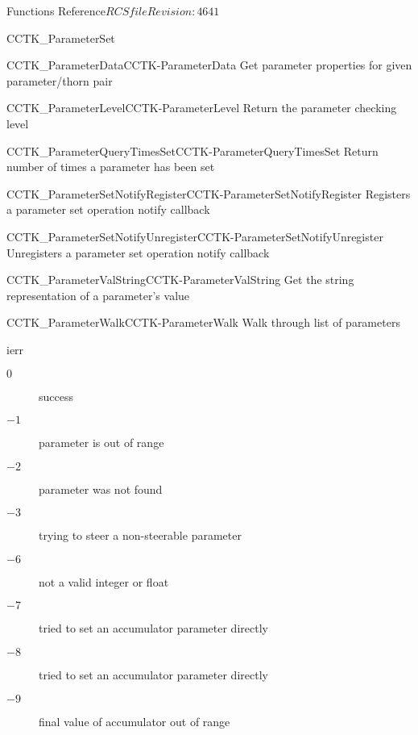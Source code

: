 \begin{cactuspart}{ Functions Reference}{$RCSfile$}{$Revision: 4641 $}
\begin{FunctionDescription}{CCTK\_ParameterSet}
\begin{SeeAlsoSection}
\begin{SeeAlso2}{CCTK\_ParameterData}{CCTK-ParameterData}
  Get parameter properties for given parameter/thorn pair
\end{SeeAlso2}
\begin{SeeAlso2}{CCTK\_ParameterLevel}{CCTK-ParameterLevel}
  Return the parameter checking level
\end{SeeAlso2}
\begin{SeeAlso2}{CCTK\_ParameterQueryTimesSet}{CCTK-ParameterQueryTimesSet}
  Return number of times a parameter has been set
\end{SeeAlso2}
\begin{SeeAlso2}{CCTK\_ParameterSetNotifyRegister}{CCTK-ParameterSetNotifyRegister}
  Registers a parameter set operation notify callback
\end{SeeAlso2}
\begin{SeeAlso2}{CCTK\_ParameterSetNotifyUnregister}{CCTK-ParameterSetNotifyUnregister}
  Unregisters a parameter set operation notify callback
\end{SeeAlso2}
\begin{SeeAlso2}{CCTK\_ParameterValString}{CCTK-ParameterValString}
  Get the string representation of a parameter's value
\end{SeeAlso2}
\begin{SeeAlso2}{CCTK\_ParameterWalk}{CCTK-ParameterWalk}
  Walk through list of parameters
\end{SeeAlso2}
\end{SeeAlsoSection}

\begin{ErrorSection}
\begin{Error}{ierr}
\begin{description}
\item[$0$] success
\item[$-1$] parameter is out of range
\item[$-2$] parameter was not found
\item[$-3$] trying to steer a non-steerable parameter
\item[$-6$] not a valid integer or float
\item[$-7$] tried to set an accumulator parameter directly
\item[$-8$] tried to set an accumulator parameter directly
\item[$-9$] final value of accumulator out of range
\end{description}
\end{Error}
\end{ErrorSection}
\end{FunctionDescription}



\end{cactuspart}
